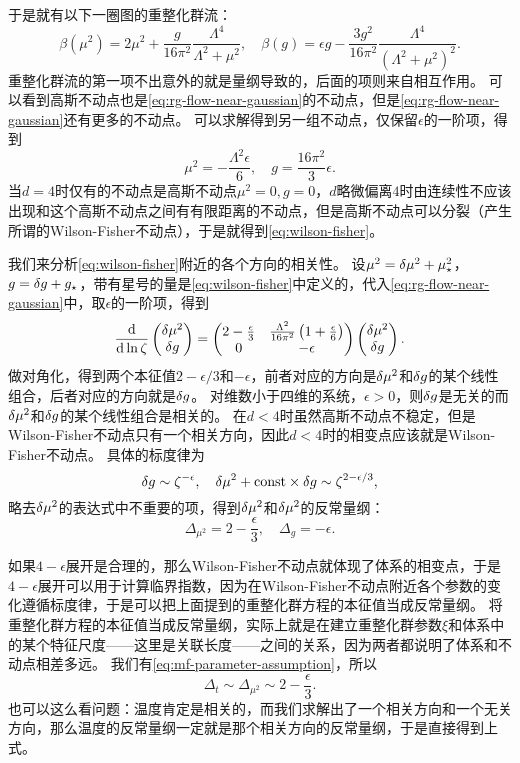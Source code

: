 \documentclass[hyperref, UTF8, a4paper]{ctexart}
\newcommand*{\const}{\mathrm{const}}
\begin{document}
于是就有以下一圈图的重整化群流：
\begin{equation}
    \beta(\mu^2) = 2 \mu^2 + \frac{g}{16 \pi^2} \frac{\Lambda^4}{\Lambda^2 + \mu^2}, \quad \beta(g) = \epsilon g - \frac{3 g^2}{16 \pi^2} \frac{\Lambda^4}{(\Lambda^2 + \mu^2)^2}.
    \label{eq:rg-flow-near-gaussian}
\end{equation}
重整化群流的第一项不出意外的就是量纲导致的，后面的项则来自相互作用。
可以看到高斯不动点也是\eqref{eq:rg-flow-near-gaussian}的不动点，但是\eqref{eq:rg-flow-near-gaussian}还有更多的不动点。
可以求解得到另一组不动点，仅保留$\epsilon$的一阶项，得到
\begin{equation}
    \mu^2 = - \frac{\Lambda^2 \epsilon}{6}, \quad g = \frac{16 \pi^2}{3} \epsilon.
    \label{eq:wilson-fisher}
\end{equation}
当$d=4$时仅有的不动点是高斯不动点$\mu^2=0, g=0$，$d$略微偏离$4$时由连续性不应该出现和这个高斯不动点之间有有限距离的不动点，但是高斯不动点可以分裂（产生所谓的Wilson-Fisher不动点），于是就得到\eqref{eq:wilson-fisher}。

我们来分析\eqref{eq:wilson-fisher}附近的各个方向的相关性。
设$\mu^2 = \var{\mu^2} + \mu_\star^2$，$g = \var{g} + g_\star$，带有星号的量是\eqref{eq:wilson-fisher}中定义的，代入\eqref{eq:rg-flow-near-gaussian}中，取$\epsilon$的一阶项，得到
\[
    \dv{\ln \zeta} \pmqty{\var{\mu^2} \\ \var{g}} = \pmqty{ 2 - \frac{\epsilon}{3} & \frac{\Lambda^2}{16 \pi^2} \left( 1 + \frac{\epsilon}{6} \right) \\ 0 & - \epsilon } \pmqty{\var{\mu^2} \\ \var{g}}.
\]
做对角化，得到两个本征值$2-\epsilon/3$和$-\epsilon$，前者对应的方向是$\var{\mu^2}$和$\var{g}$的某个线性组合，后者对应的方向就是$\var{g}$。
对维数小于四维的系统，$\epsilon>0$，则$\var{g}$是无关的而$\var{\mu^2}$和$\var{g}$的某个线性组合是相关的。
在$d<4$时虽然高斯不动点不稳定，但是Wilson-Fisher不动点只有一个相关方向，因此$d<4$时的相变点应该就是Wilson-Fisher不动点。
具体的标度律为
\[
    \var{g} \sim \zeta^{-\epsilon}, \quad \var{\mu^2} + \const \times \var{g} \sim \zeta^{2 - \epsilon/3},
\]
略去$\var{\mu^2}$的表达式中不重要的项，得到$\var{\mu^2}$和$\var{\mu^2}$的反常量纲：
\begin{equation}
    \Delta_{\mu^2} = 2 - \frac{\epsilon}{3}, \quad \Delta_g = - \epsilon.
\end{equation}

如果$4-\epsilon$展开是合理的，那么Wilson-Fisher不动点就体现了体系的相变点，于是$4-\epsilon$展开可以用于计算临界指数，因为在Wilson-Fisher不动点附近各个参数的变化遵循标度律，于是可以把上面提到的重整化群方程的本征值当成反常量纲。
将重整化群方程的本征值当成反常量纲，实际上就是在建立重整化群参数$\xi$和体系中的某个特征尺度——这里是关联长度——之间的关系，因为两者都说明了体系和不动点相差多远。
我们有\eqref{eq:mf-parameter-assumption}，所以
\begin{equation}
    \Delta_t \sim \Delta_{\mu^2} \sim 2 - \frac{\epsilon}{3}.
\end{equation}
也可以这么看问题：温度肯定是相关的，而我们求解出了一个相关方向和一个无关方向，那么温度的反常量纲一定就是那个相关方向的反常量纲，于是直接得到上式。
\end{document}
